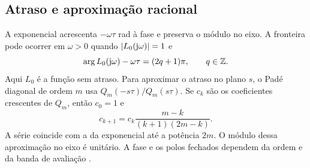 \subsection{Atraso e aproximação racional}
A exponencial acrescenta $-\omega\tau$ rad à fase e preserva o módulo
no eixo. A fronteira pode ocorrer em $\omega>0$ quando
$|L_0(\mathrm{j}\omega)|=1$ e
\begin{equation}
\arg L_0(\mathrm{j}\omega)-\omega\tau=(2q+1)\pi,
\qquad q\in\mathbb{Z}.
\label{eq:delay}
\end{equation}
Aqui $L_0$ é a função sem atraso. Para aproximar o atraso no plano
$s$, o Padé diagonal de ordem $m$ usa $Q_m(-s\tau)/Q_m(s\tau)$.
Se $c_k$ são os coeficientes crescentes de $Q_m$, então
$c_0=1$ e
\[
c_{k+1}=c_k\frac{m-k}{(k+1)(2m-k)}.
\]
A série coincide com a da exponencial até a potência $2m$.
O módulo dessa aproximação no eixo é unitário. A fase e os polos
fechados dependem da ordem e da banda de avaliação \cite{baker1996}.
